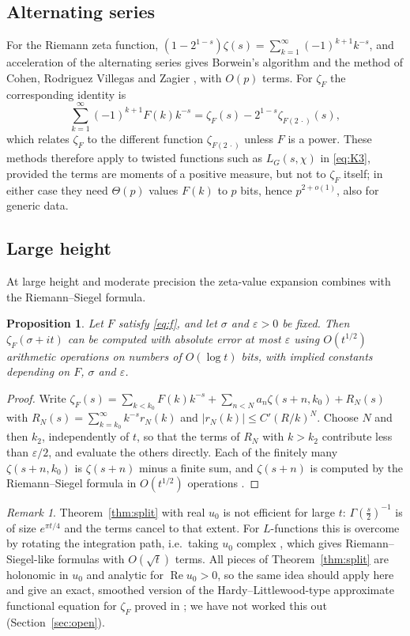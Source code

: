 \documentclass[11pt,reqno]{amsart}
\newtheorem{proposition}[theorem]{Proposition}
\theoremstyle{definition}
\theoremstyle{remark}
\newtheorem{remark}[theorem]{Remark}
\begin{document}
\subsection{Alternating series}
For the Riemann zeta function, $(1-2^{1-s})\zeta(s) = \sum_{k=1}^{\infty}(-1)^{k+1}k^{-s}$, and acceleration of the alternating
series gives Borwein's algorithm \cite{Bor00} and the method of Cohen, Rodriguez Villegas and Zagier \cite{CRVZ00}, with
$O(p)$ terms. For $\zeta_F$ the corresponding identity is
\[
  \sum_{k=1}^{\infty}(-1)^{k+1}F(k)k^{-s} = \zeta_F(s) - 2^{1-s}\zeta_{F(2\,\cdot)}(s),
\]
which relates $\zeta_F$ to the different function $\zeta_{F(2\,\cdot)}$ unless $F$ is a power. These methods therefore apply
to twisted functions such as $L_G(s,\chi)$ in \eqref{eq:K3}, provided the terms are moments of a positive measure, but
not to $\zeta_F$ itself; in either case they need $\Theta(p)$ values $F(k)$ to $p$ bits, hence $p^{2+o(1)}$, also
for generic data.

\subsection{Large height}\label{sec:rs}
At large height and moderate precision the zeta-value expansion combines with the Riemann--Siegel formula.

\begin{proposition}\label{prop:rs}
Let $F$ satisfy \eqref{eq:f}, and let $\sigma$ and $\varepsilon > 0$ be fixed. Then $\zeta_F(\sigma+it)$ can be computed
with absolute error at most $\varepsilon$ using $O(t^{1/2})$ arithmetic operations on numbers of $O(\log t)$ bits, with
implied constants depending on $F$, $\sigma$ and $\varepsilon$.
\end{proposition}

\begin{proof}
Write $\zeta_F(s) = \sum_{k<k_0}F(k)k^{-s} + \sum_{n<N}a_n\zeta(s+n,k_0) + R_N(s)$ with
$R_N(s) = \sum_{k=k_0}^{\infty}k^{-s}r_N(k)$ and $|r_N(k)| \le C'(R/k)^N$. Choose $N$ and then $k_2$, independently of $t$, so that
the terms of $R_N$ with $k > k_2$ contribute less than $\varepsilon/2$, and evaluate the others directly. Each of the
finitely many $\zeta(s+n,k_0)$ is $\zeta(s+n)$ minus a finite sum, and $\zeta(s+n)$ is computed by the Riemann--Siegel
formula in $O(t^{1/2})$ operations \cite{AdR11}.
\end{proof}

\begin{remark}\label{rem:complexu0}
Theorem~\ref{thm:split} with real $u_0$ is not efficient for large $t$: $\Gamma(\frac s2)^{-1}$ is of size
$e^{\pi t/4}$ and the terms cancel to that extent. For $L$-functions this is overcome by rotating the
integration path, i.e.\ taking $u_0$ complex \cite{Rub05}, which gives Riemann--Siegel-like formulas with
$O(\sqrt t)$ terms. All pieces of Theorem~\ref{thm:split} are holonomic in $u_0$ and analytic for
$\operatorname{Re}u_0 > 0$, so the same idea should apply here and give an exact, smoothed version of the
Hardy--Littlewood-type approximate functional equation for $\zeta_F$ proved in \cite{Joh26}; we have not worked this out (Section~\ref{sec:open}).
\end{remark}
\end{document}
